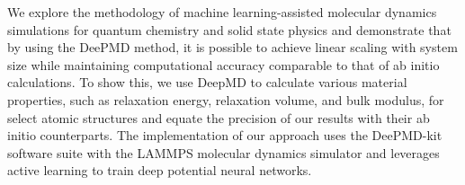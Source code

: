 We explore the methodology of machine learning-assisted molecular dynamics
simulations for quantum chemistry and solid state physics and demonstrate that
by using the DeePMD method, it is possible to achieve linear scaling with
system size while maintaining computational accuracy comparable to that of ab
initio calculations. To show this, we use DeepMD to calculate various material
properties, such as relaxation energy, relaxation volume, and bulk modulus,
for select atomic structures and equate the precision of our results with
their ab initio counterparts. The implementation of our approach uses the
DeePMD-kit software suite with the LAMMPS molecular dynamics simulator and
leverages active learning to train deep potential neural networks.

